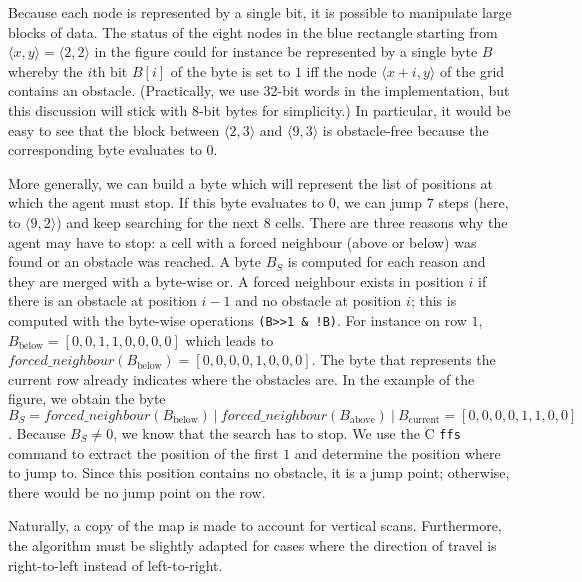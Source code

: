 Because each node is represented by a single bit, 
it is possible to manipulate large blocks of data.  
The status of the eight nodes in the blue rectangle 
starting from $\langle x,y\rangle = \langle 2,2\rangle$ in the figure 
could for instance be represented by a single byte $B$ 
whereby the $i$th bit $B[i]$ of the byte is set to $1$ 
iff the node $\langle x+i,y\rangle$ of the grid contains an obstacle.  
(Practically, we use 32-bit words in the implementation, 
but this discussion will stick with 8-bit bytes for simplicity.)
In particular, it would be easy to see that the block 
between $\langle 2,3\rangle$ and $\langle 9,3\rangle$ 
is obstacle-free because the corresponding byte evaluates to $0$.  

More generally, we can build a byte 
which will represent the list of positions 
at which the agent must stop.  
If this byte evaluates to $0$, 
we can jump $7$ steps (here, to $\langle 9,2\rangle$) 
and keep searching for the next $8$ cells.  
There are three reasons why the agent may have to stop: 
a cell with a forced neighbour (above or below) was found 
or an obstacle was reached.  
A byte $B_S$ is computed for each reason 
and they are merged with a byte-wise or.  
A forced neighbour exists in position $i$ 
if there is an obstacle at position $i-1$ 
and no obstacle at position $i$; 
this is computed with the byte-wise operations \texttt{(B>>1\ \& !B)}.  
For instance on row $1$, $B_{\mathrm{below}} = [0,0,1,1,0,0,0,0]$ 
which leads to 
$\mathit{forced\_neighbour}(B_{\mathrm{below}}) = [0,0,0,0,1,0,0,0]$.  
The byte that represents the current row already indicates 
where the obstacles are.  
In the example of the figure, 
we obtain the byte $B_S = 
\mathit{forced\_neighbour}(B_{\mathrm{below}})\ |\ 
\mathit{forced\_neighbour}(B_{\mathrm{above}})\ |\ 
B_{\mathrm{current}}
= [0,0,0,0,1,1,0,0]$.  
Because $B_S \neq 0$, 
we know that the search has to stop.  
We use the C \texttt{ffs} command 
to extract the position of the first $1$ 
and determine the position where to jump to.  
Since this position contains no obstacle, 
it is a jump point; 
otherwise, there would be no jump point on the row.  

Naturally, a copy of the map is made to account for vertical scans.  
Furthermore, the algorithm must be slightly adapted 
for cases where the direction of travel is right-to-left 
instead of left-to-right.  



